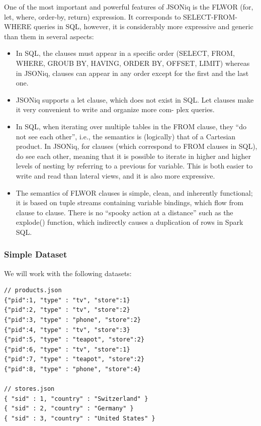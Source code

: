 One of the most important and powerful features of JSONiq is the FLWOR (for, let, where, order-by, return) expression. It corresponds to SELECT-FROM-WHERE queries in SQL, however, it is considerably more expressive and generic than them in several aspects:
\begin{itemize}
    \item In SQL, the clauses must appear in a specific order (SELECT, FROM, WHERE, GROUB BY, HAVING, ORDER BY, OFFSET, LIMIT) whereas in JSONiq, clauses can appear in any order except for the first and the last one.
    \item JSONiq supports a let clause, which does not exist in SQL. Let clauses make it very convenient to write and organize more com- plex queries.
    \item In SQL, when iterating over multiple tables in the FROM clause, they “do not see each other”, i.e., the semantics is (logically) that of a Cartesian product. In JSONiq, for clauses (which correspond to FROM clauses in SQL), do see each other, meaning that it is possible to iterate in higher and higher levels of nesting by referring to a previous for variable. This is both easier to write and read than lateral views, and it is also more expressive.
    \item The semantics of FLWOR clauses is simple, clean, and inherently functional; it is based on tuple streams containing variable bindings, which flow from clause to clause. There is no “spooky action at a distance” such as the explode() function, which indirectly causes a duplication of rows in Spark SQL.
\end{itemize}

\subsubsection{Simple Dataset}
We will work with the following datasets:

\begin{lstlisting}[style=json]
// products.json
{"pid":1, "type" : "tv", "store":1}
{"pid":2, "type" : "tv", "store":2}
{"pid":3, "type" : "phone", "store":2}
{"pid":4, "type" : "tv", "store":3}
{"pid":5, "type" : "teapot", "store":2}
{"pid":6, "type" : "tv", "store":1}
{"pid":7, "type" : "teapot", "store":2}
{"pid":8, "type" : "phone", "store":4}

// stores.json
{ "sid" : 1, "country" : "Switzerland" }
{ "sid" : 2, "country" : "Germany" }
{ "sid" : 3, "country" : "United States" }
\end{lstlisting}

